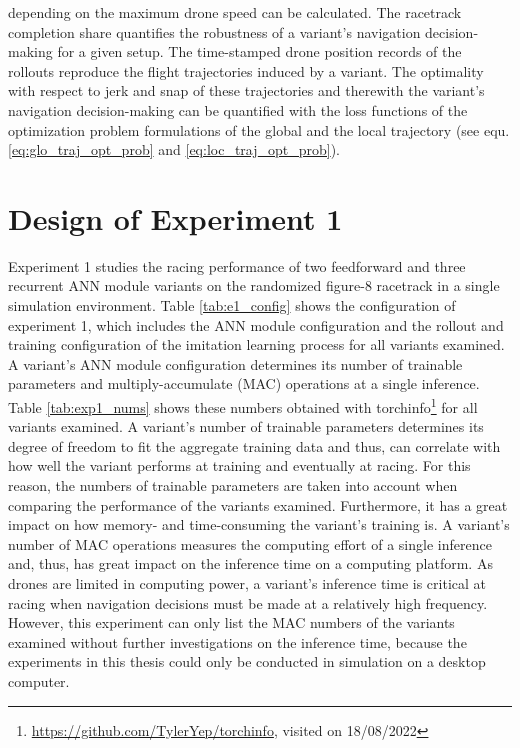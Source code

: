 depending on the maximum drone speed
can be calculated.
The racetrack completion share quantifies
the robustness of a variant's navigation decision-making 
for a given setup.
The time-stamped drone position records of the rollouts
reproduce the flight trajectories induced by a variant.
The optimality with respect to jerk and snap
of these trajectories and therewith the 
variant's navigation decision-making 
can be quantified
with the loss functions of the optimization problem formulations
of the global and the local trajectory
(see equ. \ref{eq:glo_traj_opt_prob} and \ref{eq:loc_traj_opt_prob}).









\section{Design of Experiment 1}
Experiment 1 studies the
racing performance of 
two feedforward and three recurrent ANN module variants 
on the randomized figure-8 racetrack 
in a single simulation environment.
Table \ref{tab:e1_config} shows the
configuration of experiment 1,
which includes the ANN module configuration
and the rollout and training configuration 
of the imitation learning process
for all variants examined.
A variant's ANN module configuration
determines its number of trainable parameters and 
multiply-accumulate (MAC) operations at a single inference.
Table \ref{tab:exp1_nums} shows these
numbers
obtained with 
torchinfo\footnote{\url{https://github.com/TylerYep/torchinfo}, visited on 18/08/2022}
for all variants examined.
A variant's number of trainable parameters
determines its degree of freedom to fit the aggregate training data
and thus,
can correlate with 
how well the variant performs at training
and eventually at racing.
For this reason, the numbers of trainable parameters 
are taken into account
when comparing the performance of the variants examined.
Furthermore, it has a great impact on
how memory- and time-consuming the variant's training is.
A variant's number of MAC operations 
measures the computing effort of a single inference
and, thus, has great impact on the inference time
on a computing platform.
As drones are limited in computing power,
a variant's inference time 
is critical at racing when 
navigation decisions
must be made at a relatively high frequency.
However, this experiment
can only list the MAC numbers of the variants examined
without further investigations on the inference time,
because the experiments in this thesis
could only be conducted in simulation on a desktop computer.


